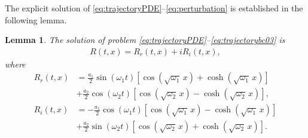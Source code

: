 \documentclass[letterpaper, 10 pt, conference]{ieeeconf}  %
\newtheorem{lemma}{Lemma}%
\begin{document}
The explicit solution of \eqref{eq:trajectoryPDE}--\eqref{eq:perturbation} is established in the following lemma.

\begin{lemma}
    The solution of problem \eqref{eq:trajectoryPDE}--\eqref{eq:trajectorybc03} is 
    \begin{align*}
        R(t,x) = R_r(t,x) + iR_{i}(t,x),
    \end{align*}
    \noindent where
\begin{align*}
    R_r(t,x) &= \frac{a_{1}}{2}\sin (\omega_{1}t)\left[\cos (\sqrt{\omega_{1}}\, x)+\cosh(\sqrt{\omega_{1}}\, x)\right] \\
    & + \frac{a_{2}}{2}\cos (\omega_{2}t)\left[\cos (\sqrt{\omega_{2}}\, x) - \cosh(\sqrt{\omega_{2}}\, x)\right],\\
    R_i(t,x) &= -\frac{a_{1}}{2}\cos (\omega_{1}t)\left[\cos (\sqrt{\omega_{1}}\, x)-\cosh(\sqrt{\omega_{1}}\, x)\right] \\
    & + \frac{a_{2}}{2}\sin (\omega_{2}t)\left[\cos (\sqrt{\omega_{2}}\, x)+\cosh(\sqrt{\omega_{2}}\, x)\right].
\end{align*}
\end{lemma}
\end{document}
